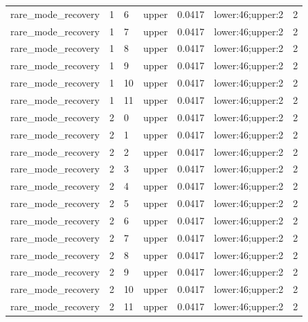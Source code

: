 \documentclass{article}
\begin{document}
\begin{table}[tbp]
{\begin{tabular}{lllllll}
rare\_mode\_recovery & 1 & 6 & upper & 0.0417 & lower:46;upper:2 & 2 \\
rare\_mode\_recovery & 1 & 7 & upper & 0.0417 & lower:46;upper:2 & 2 \\
rare\_mode\_recovery & 1 & 8 & upper & 0.0417 & lower:46;upper:2 & 2 \\
rare\_mode\_recovery & 1 & 9 & upper & 0.0417 & lower:46;upper:2 & 2 \\
rare\_mode\_recovery & 1 & 10 & upper & 0.0417 & lower:46;upper:2 & 2 \\
rare\_mode\_recovery & 1 & 11 & upper & 0.0417 & lower:46;upper:2 & 2 \\
rare\_mode\_recovery & 2 & 0 & upper & 0.0417 & lower:46;upper:2 & 2 \\
rare\_mode\_recovery & 2 & 1 & upper & 0.0417 & lower:46;upper:2 & 2 \\
rare\_mode\_recovery & 2 & 2 & upper & 0.0417 & lower:46;upper:2 & 2 \\
rare\_mode\_recovery & 2 & 3 & upper & 0.0417 & lower:46;upper:2 & 2 \\
rare\_mode\_recovery & 2 & 4 & upper & 0.0417 & lower:46;upper:2 & 2 \\
rare\_mode\_recovery & 2 & 5 & upper & 0.0417 & lower:46;upper:2 & 2 \\
rare\_mode\_recovery & 2 & 6 & upper & 0.0417 & lower:46;upper:2 & 2 \\
rare\_mode\_recovery & 2 & 7 & upper & 0.0417 & lower:46;upper:2 & 2 \\
rare\_mode\_recovery & 2 & 8 & upper & 0.0417 & lower:46;upper:2 & 2 \\
rare\_mode\_recovery & 2 & 9 & upper & 0.0417 & lower:46;upper:2 & 2 \\
rare\_mode\_recovery & 2 & 10 & upper & 0.0417 & lower:46;upper:2 & 2 \\
rare\_mode\_recovery & 2 & 11 & upper & 0.0417 & lower:46;upper:2 & 2 \\
\bottomrule
\end{tabular}
}
\end{table}

\clearpage
\end{document}
